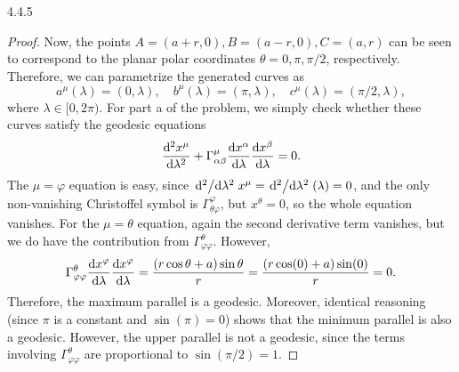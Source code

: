 \documentclass[11pt]{article}
\begin{document}
\begin{problem}{4.4.5}
\begin{proof}
Now, the points \( A = (a+r, 0), B = (a-r, 0), C = (a,r) \) can be seen to correspond to the planar polar coordinates \( \theta = 0, \pi, \pi/2 \), respectively.
Therefore, we can parametrize the generated curves as
\begin{equation}
\label{eq:13}
a^{\mu}(\lambda) = (0,\lambda), \quad b^{\mu}(\lambda) = (\pi, \lambda), \quad c^{\mu}(\lambda) = (\pi /2, \lambda),
\end{equation}
where \(\lambda \in [0, 2\pi)\).
For part a of the problem, we simply check whether these curves satisfy the geodesic equations
\begin{equation}
\label{eq:14}
\dv[2]{x^{\mu}}{\lambda} + \Gamma_{\alpha\beta}^{\mu} \dv{x^{\alpha}}{\lambda} \dv{x^{\beta}}{\lambda} = 0.
\end{equation}
The \(\mu = \varphi\) equation is easy, since \( \dv*[2]{\lambda}x^{\mu} = \dv*[2]{\lambda}(\lambda) = 0 \), and the only non-vanishing Christoffel symbol is \(\Gamma_{\theta\varphi}^{\varphi}\), but \( x^{\theta} = 0 \), so the whole equation vanishes.
For the \(\mu = \theta\) equation, again the second derivative term vanishes, but we do have the contribution from \(\Gamma_{\varphi\varphi}^{\theta}\).
However,
\begin{equation}
\label{eq:15}
\Gamma_{\varphi\varphi}^{\theta} \dv{x^{\varphi}}{\lambda}\dv{x^{\varphi}}{\lambda} = \frac{(r\cos\theta + a)\sin\theta}{r} = \frac{(r\cos(0) + a)\sin(0)}{r} = 0.
\end{equation}
Therefore, the maximum parallel is a geodesic.
Moreover, identical reasoning (since \(\pi \) is a constant and \( \sin(\pi) = 0 \)) shows that the minimum parallel is also a geodesic.
However, the upper parallel is not a geodesic, since the terms involving \(\Gamma_{\varphi\varphi}^{\theta}\) are proportional to \( \sin(\pi/2) = 1 \).


\end{proof}
\end{problem}
\end{document}
